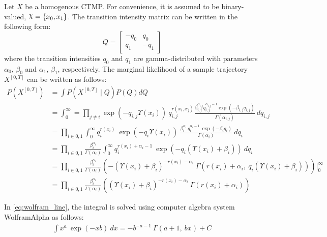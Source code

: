 Let $ X $ be a homogenous CTMP. For convenience, it is assumed to be binary-valued, $ \rchi = \left\lbrace x_{0}, x_{1} \right\rbrace $. The transition intensity matrix can be written in the following form:
\begin{equation}
Q = 
\begin{bmatrix}
-q_{0} & q_{0} \\
q_{1} & -q_{1}
\end{bmatrix}
\end{equation}
where the transition intensities $ q_{0} $ and $ q_{1} $ are gamma-distributed with parameters $ \alpha_{0}$, $ \beta_{0} $ and $ \alpha_{1} $, $ \beta_{1} $, respectively. The marginal likelihood of a sample trajectory $ X^{[0,T]} $ can be written as follows:
\begin{align}
P(X^{[0, T]}) & = \int  P(X^{[0, T]}\mid Q)P(Q) dQ \nonumber\\ 
& = \int_{0}^{\infty} = \prod_{j \neq i}  \exp(-q_{i,j}\Upsilon(x_{i}))\ q_{i,j}^{r(x_{i},x_{j})} \frac{\beta_{i,j}^{\alpha_{i,j}}{q_{i,j}^{\alpha_{i,j}-1}}\exp(-\beta_{i,j}q_{i,j})}{\Gamma(\alpha_{i,j})} \ dq_{i,j} \nonumber\\ 
& = \prod_{i\in{0,1}}\int_{0}^{\infty} q_{i}^{r(x_{i})} \ \exp(-q_{i}\Upsilon(x_{i})) \  \frac{\beta_{i}^{\alpha_{i}} \ q_{i}^{\alpha_{i}-1}\ \exp(-\beta_{i}q_{i})}{\Gamma(\alpha_{i})} \ dq_{i} \nonumber\\ 
& = \prod_{i\in{0,1}} \frac{\beta_{i}^{\alpha_{i}}}{\Gamma(\alpha_{i})} \int_{0}^{\infty} q_{i}^{r(x_{i}) + \alpha_{i} -1} \ \exp(-q_{i}(\Upsilon(x_{i})+\beta_{i})) \ dq_{i} \label{eq:wolfram_line}\\ 
& = \prod_{i\in{0,1}} \frac{\beta_{i}^{\alpha_{i}}}{\Gamma(\alpha_{i})} \left( -(\Upsilon(x_{i})+\beta_{i})^{-r(x_{i}) - \alpha_{i}}\ \Gamma(r(x_{i}) + \alpha_{i}, \ q_{i}(\Upsilon(x_{i})+\beta_{i})) \right) \Big|_0^\infty  \nonumber\\ 
& = \prod_{i\in{0,1}} \frac{\beta_{i}^{\alpha_{i}}}{\Gamma(\alpha_{i})} \left( (\Upsilon(x_{i})+\beta_{i})^{-r(x_{i}) - \alpha_{i}}\ \Gamma(r(x_{i}) + \alpha_{i}) \right)
\label{eq:Marg_traj}
\end{align}

In \autoref{eq:wolfram_line}, the integral is solved using computer algebra system WolframAlpha as follows:
\begin{align}
\int x^{a} \ \exp(-xb) \ dx = -b^{-a-1} \ \Gamma(a+1, \ bx) + C
\label{eq:integral}
\end{align}

